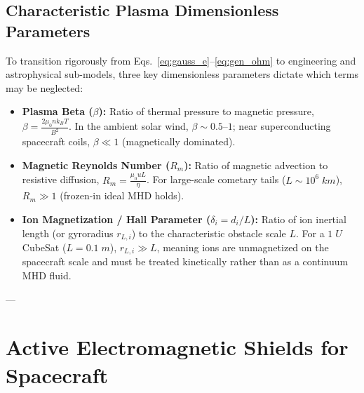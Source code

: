 \documentclass[11pt,a4paper]{article}
\begin{document}
\subsection{Characteristic Plasma Dimensionless Parameters}
To transition rigorously from Eqs.~\eqref{eq:gauss_e}--\eqref{eq:gen_ohm} to engineering and astrophysical sub-models, three key dimensionless parameters dictate which terms may be neglected:
\begin{itemize}
    \item \textbf{Plasma Beta ($\beta$):} Ratio of thermal pressure to magnetic pressure, $\beta = \frac{2\mu_0 n k_B T}{B^2}$. In the ambient solar wind, $\beta \sim 0.5\text{--}1$; near superconducting spacecraft coils, $\beta \ll 1$ (magnetically dominated).
    \item \textbf{Magnetic Reynolds Number ($R_m$):} Ratio of magnetic advection to resistive diffusion, $R_m = \frac{\mu_0 u L}{\eta}$. For large-scale cometary tails ($L \sim 10^6\;\si{km}$), $R_m \gg 1$ (frozen-in ideal MHD holds).
    \item \textbf{Ion Magnetization / Hall Parameter ($\delta_i = d_i / L$):} Ratio of ion inertial length (or gyroradius $r_{L,i}$) to the characteristic obstacle scale $L$. For a $1\;\si{U}$ CubeSat ($L = 0.1\;\si{m}$), $r_{L,i} \gg L$, meaning ions are unmagnetized on the spacecraft scale and must be treated kinetically rather than as a continuum MHD fluid.
\end{itemize}

---

\section{Active Electromagnetic Shields for Spacecraft}
\end{document}

